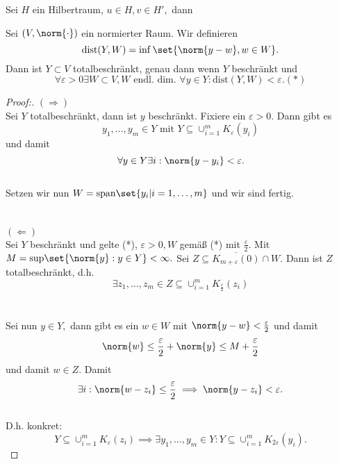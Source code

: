 \begin{ex} Sei $H$ ein Hilbertraum, $u \in H, v \in H',$ dann 
	
\end{ex}


\begin{theorem} Sei $(V, \norm{\cdot})$ ein normierter Raum. Wir definieren \[\text{dist}(Y, W) = \inf{\set{\norm{y-w}, w \in W}}.\] Dann ist $Y \subset V$ totalbeschränkt, genau dann wenn $Y$ beschränkt und \[\forall \varepsilon >0 \exists W \subset V, W \text{ endl. dim. } \forall y \in Y: \text{dist}(Y, W) < \varepsilon. (*)\]
	
	\begin{proof}[Proof:] $(\Rightarrow)$ \\
		
		Sei $Y$ totalbeschränkt, dann ist $y$ beschränkt. Fixiere ein $\varepsilon > 0.$ Dann gibt es \[y_1, \ldots, y_m \in Y \text{ mit } Y \subseteq \cup_{i = 1}^m K_{\varepsilon}(y_i)\] und damit \[\forall y \in Y \exists i: \norm{y- y_i} < \varepsilon.\] \\
		Setzen wir nun $W = \text{span}\set{y_i | i = 1, \ldots, m}$ und wir sind fertig. \\ \\ \\
		$(\Leftarrow)$ \\
		Sei $Y$ beschränkt und gelte (*), $\varepsilon > 0, W$ gemäß (*) mit $\frac{\varepsilon}{2}.$ Mit $M = \text{sup}{\set{\norm{y}: y \in Y}} < \infty.$ Sei $Z\subseteq \overline{K_{m + \varepsilon}(0)} \cap W.$ Dann ist $Z$ totalbeschränkt, d.h. \[\exists z_1, \ldots, z_m \in Z \subseteq \cup_{i = 1}^m K_{\frac{\varepsilon}{2}}(z_i)\] \\ \\
		Sei nun $y \in Y,$ dann gibt es ein $w \in W$ mit $\norm{y - w} < \frac{\varepsilon}{2}$ und damit \[\norm{w} \leq \frac{\varepsilon}{2} + \norm{y} \leq M + \frac{\varepsilon}{2}\] und damit $w \in Z.$ Damit \[\exists i: \norm{w - z_i} \leq \frac{\varepsilon}{2} \implies \norm{y-z_i} < \varepsilon.\] \\ D.h. konkret: \\
		\[Y \subseteq \cup_{i = 1}^m K_{\varepsilon}(z_i) \implies \exists y_1, \ldots, y_m \in Y: Y \subseteq \cup_{i = 1}^m K_{2 \varepsilon}(y_i).\]
	\end{proof}
	
\end{theorem}
